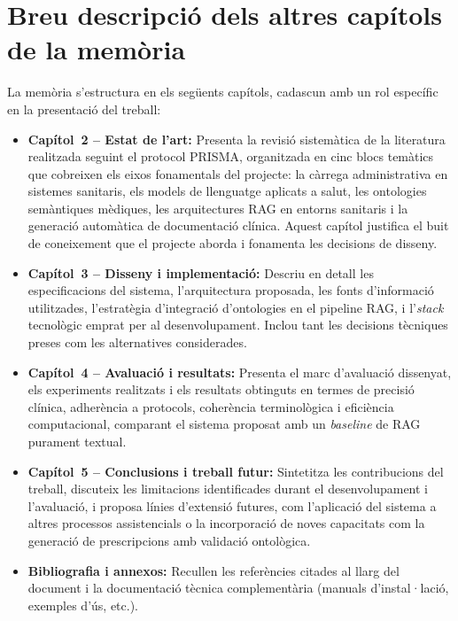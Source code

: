 \documentclass[CAT]{TFUOC}%
\begin{document}
\section{Breu descripció dels altres capítols de la memòria}

La memòria s'estructura en els següents capítols, cadascun amb un rol específic en la presentació del treball:

\begin{itemize}
    \item \textbf{Capítol~2 -- Estat de l'art:} Presenta la revisió sistemàtica de la literatura realitzada seguint el protocol PRISMA, organitzada en cinc blocs temàtics que cobreixen els eixos fonamentals del projecte: la càrrega administrativa en sistemes sanitaris, els models de llenguatge aplicats a salut, les ontologies semàntiques mèdiques, les arquitectures RAG en entorns sanitaris i la generació automàtica de documentació clínica. Aquest capítol justifica el buit de coneixement que el projecte aborda i fonamenta les decisions de disseny.

    \item \textbf{Capítol~3 -- Disseny i implementació:} Descriu en detall les especificacions del sistema, l'arquitectura proposada, les fonts d'informació utilitzades, l'estratègia d'integració d'ontologies en el pipeline RAG, i l'\textit{stack} tecnològic emprat per al desenvolupament. Inclou tant les decisions tècniques preses com les alternatives considerades.

    \item \textbf{Capítol~4 -- Avaluació i resultats:} Presenta el marc d'avaluació dissenyat, els experiments realitzats i els resultats obtinguts en termes de precisió clínica, adherència a protocols, coherència terminològica i eficiència computacional, comparant el sistema proposat amb un \textit{baseline} de RAG purament textual.

    \item \textbf{Capítol~5 -- Conclusions i treball futur:} Sintetitza les contribucions del treball, discuteix les limitacions identificades durant el desenvolupament i l'avaluació, i proposa línies d'extensió futures, com l'aplicació del sistema a altres processos assistencials o la incorporació de noves capacitats com la generació de prescripcions amb validació ontològica.

    \item \textbf{Bibliografia i annexos:} Recullen les referències citades al llarg del document i la documentació tècnica complementària (manuals d'instal·lació, exemples d'ús, etc.).
\end{itemize}
\end{document}

